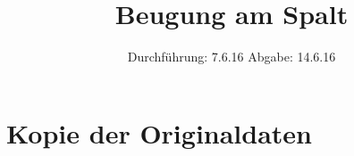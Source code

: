 

\subject{V 406}
\title{Beugung am Spalt}
\date{
  Durchführung: 7.6.16
  \hspace{3em}
  Abgabe: 14.6.16
}



\maketitle
\thispagestyle{empty}
\tableofcontents
\newpage






\printbibliography

\appendix
\section{Kopie der Originaldaten}


